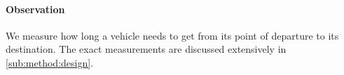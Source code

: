 

\paragraph{Observation} 
We measure how long a vehicle needs to get from its point of departure to its destination. The exact measurements are discussed extensively in \cref{sub:method:design}.


